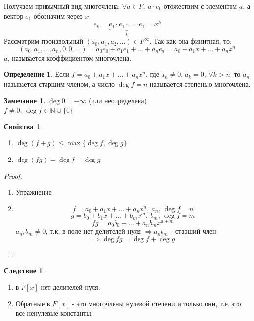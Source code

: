 \documentclass[a4paper, 12pt]{article}
\newcommand{\N}{\mathbb N}
\newcommand\tab[1][.5cm]{\hspace*{#1}}
\theoremstyle{definition}
\newtheorem*{definition}{Определение}
\newtheorem*{consequense}{Следствие}
\newtheorem*{remark}{Замечание}
\newtheorem*{properties}{Свойства}
\begin{document}
  Получаем привычный вид многочлена: 
  $\forall a \in F: \ a\cdot e_0$ отожествим с элементом $a$, а вектор $e_1$ обозначим через $x$:
  $$e_k = \underbrace{e_1 \cdot e_1 \cdot ... \cdot e_1}_{k}  = x^k$$     
  Рассмотрим произвольный $(a_0,a_1, a_2,...) \in F^{\infty}$. Так как она финитная, то: 
  $$(a_0,a_1, ..., a_n,0, 0,...) = a_0e_0 + a_1e_1+...+a_ne_n = a_0 + a_1x+...+a_nx^n$$
  $a_i$ называется коэффициентом многочлена.
  \begin{definition}
    Если $f = a_0 + a_1x+...+a_nx^n$, где $a_n \neq 0$, $a_k = 0,  \ \forall k>n$, то $a_n$ называется старшим членом, а число $\deg f = n$  называется степенью многочлена.  
  \end{definition} 
  \begin{remark}
    $\deg 0 = -\infty$ (или неопределена)\\
    $f\neq 0, \ \deg f \in \N \cup \{0\}$  
  \end{remark} 
  \begin{properties}\tab
    \begin{enumerate}
      \item $\deg (f+g) \leq \max \{\deg f, \deg g\}$
      \item $\deg (fg) = \deg f + \deg g$  
    \end{enumerate}
  \end{properties}
  \begin{proof} \tab
    \begin{enumerate}
      \item Упражнение
      \item $$f = a_0 + a_1x+...+a_nx^n, \ a_n, \ \deg f = n$$
      $$g = b_0 + b_1x+...+b_mx^m, \ b_m, \ \deg f = m$$
      $$fg = a_0b_0 +...+a_nb_mx^{n+m}$$
      $a_n, b_m \neq 0$, т.к. в поле нет делителей нуля 
      $\Longrightarrow a_nb_m$ - старший член $$\Longrightarrow \deg fg = \deg f + \deg g$$     
    \end{enumerate}
  \end{proof}
  \begin{consequense}\tab
    \begin{enumerate}
      \item в $F[x]$ нет делителей нуля.
      \item Обратные в $F[x]$ - это многочлены нулевой степени и только они, т.е. это все ненулевые константы. 
    \end{enumerate}
  \end{consequense} 
\end{document}
